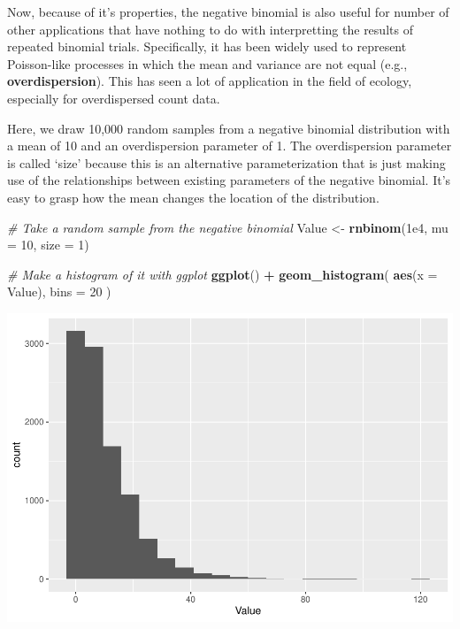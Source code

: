 \documentclass[
]{book}
\newenvironment{Shaded}{\begin{snugshade}}{\end{snugshade}}
\newcommand{\CommentTok}[1]{\textcolor[rgb]{0.56,0.35,0.01}{\textit{#1}}}
\newcommand{\DataTypeTok}[1]{\textcolor[rgb]{0.13,0.29,0.53}{#1}}
\newcommand{\DecValTok}[1]{\textcolor[rgb]{0.00,0.00,0.81}{#1}}
\newcommand{\FloatTok}[1]{\textcolor[rgb]{0.00,0.00,0.81}{#1}}
\newcommand{\KeywordTok}[1]{\textcolor[rgb]{0.13,0.29,0.53}{\textbf{#1}}}
\newcommand{\NormalTok}[1]{#1}
\newcommand{\OperatorTok}[1]{\textcolor[rgb]{0.81,0.36,0.00}{\textbf{#1}}}
\newcommand{\StringTok}[1]{\textcolor[rgb]{0.31,0.60,0.02}{#1}}
\begin{document}
Now, because of it's properties, the negative binomial is also useful for number of other applications that have nothing to do with interpretting the results of repeated binomial trials. Specifically, it has been widely used to represent Poisson-like processes in which the mean and variance are not equal (e.g., \textbf{overdispersion}). This has seen a lot of application in the field of ecology, especially for overdispersed count data.

Here, we draw 10,000 random samples from a negative binomial distribution with a mean of 10 and an overdispersion parameter of 1. The overdispersion parameter is called `size' because this is an alternative parameterization that is just making use of the relationships between existing parameters of the negative binomial. It's easy to grasp how the mean changes the location of the distribution.

\begin{Shaded}
\begin{Highlighting}[]
\CommentTok{# Take a random sample from the negative binomial}
\NormalTok{Value <-}\StringTok{ }\KeywordTok{rnbinom}\NormalTok{(}\FloatTok{1e4}\NormalTok{, }\DataTypeTok{mu =} \DecValTok{10}\NormalTok{, }\DataTypeTok{size =} \DecValTok{1}\NormalTok{)}

\CommentTok{# Make a histogram of it with ggplot}
\KeywordTok{ggplot}\NormalTok{() }\OperatorTok{+}\StringTok{ }\KeywordTok{geom_histogram}\NormalTok{( }\KeywordTok{aes}\NormalTok{(}\DataTypeTok{x =}\NormalTok{ Value), }\DataTypeTok{bins =} \DecValTok{20}\NormalTok{ )}
\end{Highlighting}
\end{Shaded}

\includegraphics{worstr_files/figure-latex/unnamed-chunk-142-1.pdf}
\end{document}

